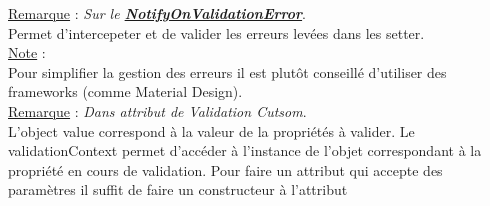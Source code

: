 \documentclass[a4paper,12pt,twoside]{article}
\newcommand{\urlcolor}{magenta}  %
\newcommand{\keycolor}{purple} %
\newcommand{\rem}[2]{\noindent\underline{Remarque} : \textit{#1}.\\ \indent #2}
\newcommand{\note}[1]{\noindent\underline{Note} : \\ \indent #1}
\newcommand{\keyref}[2]{\hypersetup{urlcolor=\keycolor} \href{#1}{\textbf{#2}}\hypersetup{urlcolor=\urlcolor}}
\begin{document}
\rem{Sur le \keyref{https://docs.microsoft.com/en-us/dotnet/api/system.windows.data.binding.notifyonvalidationerror?redirectedfrom=MSDN&view=windowsdesktop-6.0#System_Windows_Data_Binding_NotifyOnValidationError}{NotifyOnValidationError}}{Permet d'intercepeter et de valider les erreurs levées dans les setter.}\\

\note{Pour simplifier la gestion des erreurs il est plutôt conseillé d'utiliser des frameworks (comme Material Design).}\\

\rem{Dans attribut de Validation Cutsom}{L'object value correspond à la valeur de la propriétés à valider. Le validationContext permet d'accéder à l'instance de l'objet correspondant à la propriété en cours de validation. Pour faire un attribut qui accepte des paramètres il suffit de faire un constructeur à l'attribut}\\



\end{document}
